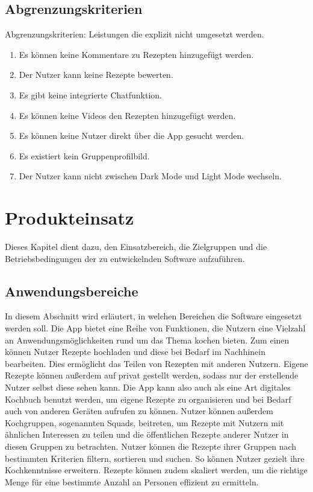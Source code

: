 \documentclass[parskip=full]{scrartcl}
\begin{document}
\subsection{Abgrenzungskriterien}
Abgrenzungskriterien: Leistungen die explizit nicht umgesetzt werden.

\begin{enumerate}[start=1,label={$\langle$\bfseries RW\arabic*$\rangle$}, leftmargin = 5em, itemsep=4pt, parsep=4pt]
    \item Es können keine Kommentare zu Rezepten hinzugefügt werden.
    \item Der Nutzer kann keine Rezepte bewerten.
    \item Es gibt keine integrierte Chatfunktion.
    \item Es können keine Videos den Rezepten hinzugefügt werden.
    \item Es können keine Nutzer direkt über die App gesucht werden.
    \item Es existiert kein Gruppenprofilbild.
    \item Der Nutzer kann  nicht zwischen Dark Mode und Light Mode wechseln.
\end{enumerate}

\section{Produkteinsatz}
Dieses Kapitel dient dazu, den Einsatzbereich, die Zielgruppen und die Betriebsbedingungen der zu entwickelnden Software aufzuführen.

\subsection{Anwendungsbereiche}
In diesem Abschnitt wird erläutert, in welchen Bereichen die Software eingesetzt werden soll. \newline
Die App bietet eine Reihe von Funktionen, die Nutzern eine Vielzahl an Anwendungsmöglichkeiten rund um das Thema kochen bieten. 
Zum einen können Nutzer Rezepte hochladen und diese bei Bedarf im Nachhinein bearbeiten. 
Dies ermöglicht das Teilen von Rezepten mit anderen Nutzern. Eigene Rezepte können außerdem auf privat gestellt werden, sodass nur der erstellende Nutzer selbst diese sehen kann.
Die App kann also auch als eine Art digitales Kochbuch benutzt werden, um eigene Rezepte zu organisieren und bei Bedarf auch von anderen Geräten aufrufen zu können.  
Nutzer können außerdem Kochgruppen, sogenannten Squads, beitreten, um Rezepte mit Nutzern mit ähnlichen Interessen zu teilen und die öffentlichen Rezepte anderer Nutzer in diesen Gruppen zu betrachten. Nutzer können die Rezepte ihrer Gruppen nach bestimmten Kriterien filtern, sortieren und suchen. So können Nutzer gezielt ihre Kochkenntnisse erweitern.
Rezepte können zudem skaliert werden, um die richtige Menge für eine bestimmte Anzahl an Personen effizient zu ermitteln. 
\end{document}
